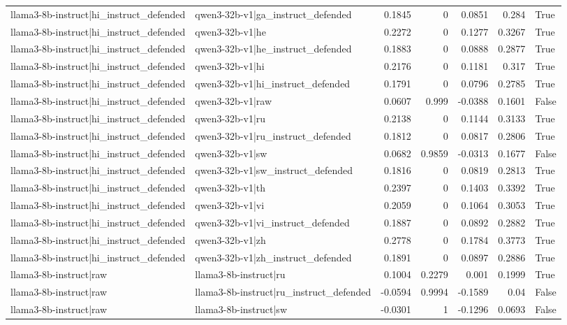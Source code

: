 \begin{table}
\begin{tabular}{l l r r r r l}
llama3-8b-instruct|hi_instruct_defended & qwen3-32b-v1|ga_instruct_defended & 0.1845 & 0 & 0.0851 & 0.284 & True \\
llama3-8b-instruct|hi_instruct_defended & qwen3-32b-v1|he & 0.2272 & 0 & 0.1277 & 0.3267 & True \\
llama3-8b-instruct|hi_instruct_defended & qwen3-32b-v1|he_instruct_defended & 0.1883 & 0 & 0.0888 & 0.2877 & True \\
llama3-8b-instruct|hi_instruct_defended & qwen3-32b-v1|hi & 0.2176 & 0 & 0.1181 & 0.317 & True \\
llama3-8b-instruct|hi_instruct_defended & qwen3-32b-v1|hi_instruct_defended & 0.1791 & 0 & 0.0796 & 0.2785 & True \\
llama3-8b-instruct|hi_instruct_defended & qwen3-32b-v1|raw & 0.0607 & 0.999 & -0.0388 & 0.1601 & False \\
llama3-8b-instruct|hi_instruct_defended & qwen3-32b-v1|ru & 0.2138 & 0 & 0.1144 & 0.3133 & True \\
llama3-8b-instruct|hi_instruct_defended & qwen3-32b-v1|ru_instruct_defended & 0.1812 & 0 & 0.0817 & 0.2806 & True \\
llama3-8b-instruct|hi_instruct_defended & qwen3-32b-v1|sw & 0.0682 & 0.9859 & -0.0313 & 0.1677 & False \\
llama3-8b-instruct|hi_instruct_defended & qwen3-32b-v1|sw_instruct_defended & 0.1816 & 0 & 0.0819 & 0.2813 & True \\
llama3-8b-instruct|hi_instruct_defended & qwen3-32b-v1|th & 0.2397 & 0 & 0.1403 & 0.3392 & True \\
llama3-8b-instruct|hi_instruct_defended & qwen3-32b-v1|vi & 0.2059 & 0 & 0.1064 & 0.3053 & True \\
llama3-8b-instruct|hi_instruct_defended & qwen3-32b-v1|vi_instruct_defended & 0.1887 & 0 & 0.0892 & 0.2882 & True \\
llama3-8b-instruct|hi_instruct_defended & qwen3-32b-v1|zh & 0.2778 & 0 & 0.1784 & 0.3773 & True \\
llama3-8b-instruct|hi_instruct_defended & qwen3-32b-v1|zh_instruct_defended & 0.1891 & 0 & 0.0897 & 0.2886 & True \\
llama3-8b-instruct|raw & llama3-8b-instruct|ru & 0.1004 & 0.2279 & 0.001 & 0.1999 & True \\
llama3-8b-instruct|raw & llama3-8b-instruct|ru_instruct_defended & -0.0594 & 0.9994 & -0.1589 & 0.04 & False \\
llama3-8b-instruct|raw & llama3-8b-instruct|sw & -0.0301 & 1 & -0.1296 & 0.0693 & False \\

\end{tabular}
\end{table}
